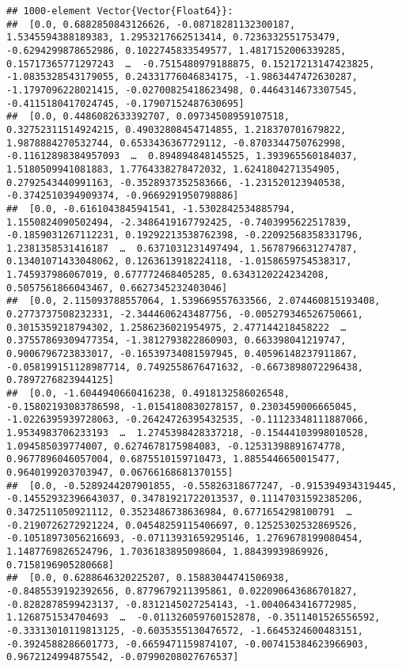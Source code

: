 \documentclass[
]{article}
\begin{document}
\begin{verbatim}
## 1000-element Vector{Vector{Float64}}:
##  [0.0, 0.6882850843126626, -0.08718281132300187, 1.5345594388189383, 1.2953217662513414, 0.7236332551753479, -0.6294299878652986, 0.1022745833549577, 1.4817152006339285, 0.15717365771297243  …  -0.7515480979188875, 0.15217213147423825, -1.0835328543179055, 0.24331776046834175, -1.9863447472630287, -1.1797096228021415, -0.02700825418623498, 0.4464314673307545, -0.4115180417024745, -0.17907152487630695]
##  [0.0, 0.4486082633392707, 0.09734508959107518, 0.32752311514924215, 0.49032808454714855, 1.218370701679822, 1.9878884270532744, 0.6533436367729112, -0.8703344750762998, -0.11612898384957093  …  0.894894848145525, 1.393965560184037, 1.5180509941081883, 1.7764338278472032, 1.6241804271354905, 0.2792543440991163, -0.3528937352583666, -1.231520123940538, -0.3742510394909374, -0.9669291950798886]
##  [0.0, -0.6161043845941541, -1.5302842534885794, 1.1550824090502494, -2.3486419167792425, -0.7403995622517839, -0.1859031267112231, 0.19292213538762398, -0.22092568358331796, 1.2381358531416187  …  0.6371031231497494, 1.5678796631274787, 0.13401071433048062, 0.1263613918224118, -1.0158659754538317, 1.745937986067019, 0.677772468405285, 0.6343120224234208, 0.5057561866043467, 0.6627345232403046]
##  [0.0, 2.115093788557064, 1.539669557633566, 2.074460815193408, 0.2773737508232331, -2.3444606243487756, -0.005279346526750661, 0.3015359218794302, 1.2586236021954975, 2.477144218458222  …  0.37557869309477354, -1.3812793822860903, 0.663398041219747, 0.9006796723833017, -0.16539734081597945, 0.40596148237911867, -0.058199151128987714, 0.7492558676471632, -0.6673898072296438, 0.7897276823944125]
##  [0.0, -1.6044940660416238, 0.4918132586026548, -0.15802193083786598, -1.0154180830278157, 0.2303459006665045, -1.0226395939728063, -0.26424726395432535, -0.11123348111887066, 1.9534983706233193  …  1.2745398428337218, -0.15444103998010528, 1.094585039774007, 0.6274678175984083, -0.12531398891674778, 0.9677896046057004, 0.6875510159710473, 1.8855446650015477, 0.9640199203703947, 0.06766168681370155]
##  [0.0, -0.5289244207901855, -0.55826318677247, -0.915394934319445, -0.14552932396643037, 0.34781921722013537, 0.11147031592385206, 0.3472511050921112, 0.3523486738636984, 0.6771654298100791  …  -0.2190726272921224, 0.04548259115406697, 0.12525302532869526, -0.10518973056216693, -0.07113931659295146, 1.2769678199080454, 1.1487769826524796, 1.7036183895098604, 1.88439939869926, 0.7158196905280668]
##  [0.0, 0.6288646320225207, 0.15883044741506938, -0.8485539192392656, 0.8779679211395861, 0.022090643686701827, -0.8282878599423137, -0.8312145027254143, -1.0040643416772985, 1.1268751534704693  …  -0.011326059760152878, -0.3511401526556592, -0.33313010119813125, -0.6035355130476572, -1.6645324600483151, -0.3924588286601773, -0.6659471159874107, -0.007415384623966903, 0.9672124994875542, -0.07990208027676537]

\end{verbatim}
\end{document}
